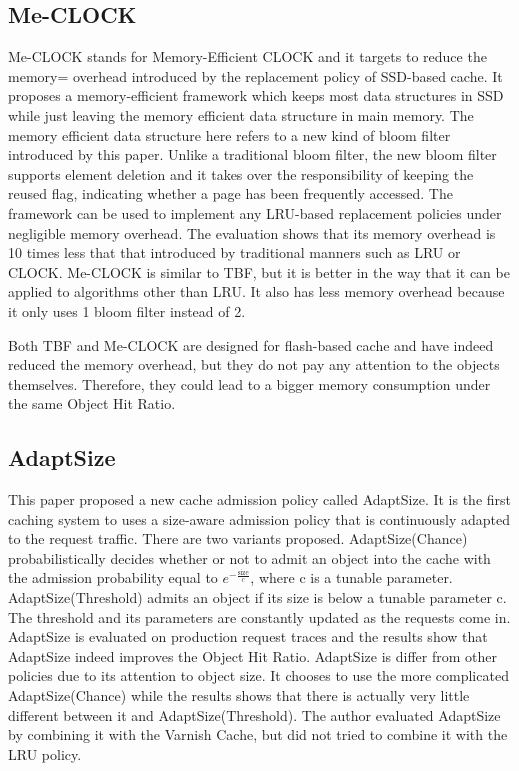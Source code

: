 \documentclass[conference]{IEEEtran}
\begin{document}
\subsection{Me-CLOCK}
Me-CLOCK stands for Memory-Efficient CLOCK and it targets to reduce the memory= overhead introduced by the replacement policy of SSD-based cache. It proposes a memory-efficient framework which keeps most data structures in SSD while just leaving the memory efficient data structure in main memory.
The memory efficient data structure here refers to a new kind of bloom filter introduced by this paper. Unlike a traditional bloom filter, the new bloom filter supports element deletion and it takes over the responsibility of keeping the reused flag, indicating whether a page has been frequently accessed. The framework can be used to implement any LRU-based replacement policies under negligible memory overhead. The evaluation shows that its memory overhead is 10 times less that that introduced by traditional manners such as LRU or CLOCK.
Me-CLOCK is similar to TBF, but it is better in the way that it can be applied to algorithms other than LRU. It also has less memory overhead because it only uses 1 bloom filter instead of 2.

Both TBF and Me-CLOCK are designed for flash-based cache and have indeed reduced the memory overhead, but they do not pay any attention to the objects themselves. Therefore, they could lead to a bigger memory consumption under the same Object Hit Ratio.

\subsection{AdaptSize}
This paper proposed a new cache admission policy called AdaptSize. It is the first caching system to uses a size-aware admission policy that is continuously adapted to the request traffic. There are two variants proposed. AdaptSize(Chance) probabilistically decides whether or not to admit an object into the cache with the admission probability equal to $e^{-\frac{\text{size}}{c}}$, where c is a tunable parameter. AdaptSize(Threshold) admits an object if its size is below a tunable parameter c. The threshold and its parameters are constantly updated as the requests come in. AdaptSize is evaluated on production request traces and the results show that AdaptSize indeed improves the Object Hit Ratio.
AdaptSize is differ from other policies due to its attention to object size. It chooses to use the more complicated AdaptSize(Chance) while the results shows that there is actually very little different between it and AdaptSize(Threshold). The author evaluated AdaptSize by combining it with the Varnish Cache, but did not tried to combine it with the LRU policy.
\end{document}
